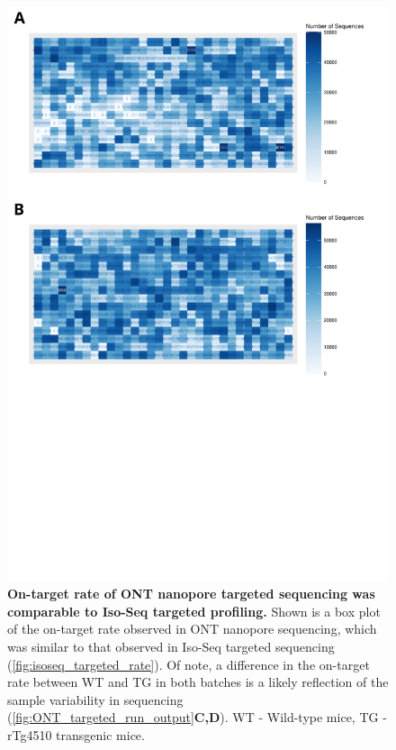 \begin{figure}[]
	\centering
	\includegraphics[page=5,trim={0 27cm 0 0cm},clip,scale = 0.5]{Figures/ONTTargetedTranscriptome.pdf}
	\captionsetup{width=0.95\textwidth}
	\caption[On-target rate of ONT targeted profiling]%
	{\textbf{On-target rate of ONT nanopore targeted sequencing was comparable to Iso-Seq targeted profiling.} Shown is a box plot of the on-target rate observed in ONT nanopore sequencing, which was similar to that observed in Iso-Seq targeted sequencing (\cref{fig:isoseq_targeted_rate}). Of note, a difference in the on-target rate between WT and TG in both batches is a likely reflection of the sample variability in sequencing (\cref{fig:ONT_targeted_run_output}\textbf{C,D}). WT - Wild-type mice, TG - rTg4510 transgenic mice.}
	\label{fig:ont_targeted_rate}
\end{figure}

